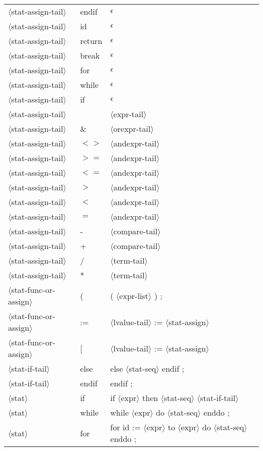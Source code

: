 \documentclass[11pt, fleqn]{article}
\newcommand{\atag}[1]{$\langle$#1$\rangle$}
\begin{document}
\begin{longtable}{l|l|l}
\atag{stat-assign-tail}			&	endif			&	$\epsilon$	\\
\atag{stat-assign-tail}			&	id			&	$\epsilon$	\\
\atag{stat-assign-tail}			&	return			&	$\epsilon$	\\
\atag{stat-assign-tail}			&	break			&	$\epsilon$	\\
\atag{stat-assign-tail}			&	for			&	$\epsilon$	\\
\atag{stat-assign-tail}			&	while			&	$\epsilon$	\\
\atag{stat-assign-tail}			&	if			&	$\epsilon$	\\
\atag{stat-assign-tail}			&	\textbar		&	\atag{expr-tail}	\\
\atag{stat-assign-tail}			&	\&			&	\atag{orexpr-tail}	\\
\atag{stat-assign-tail}			&	$<>$			&	\atag{andexpr-tail}	\\
\atag{stat-assign-tail}			&	$>=$			&	\atag{andexpr-tail}	\\
\atag{stat-assign-tail}			&	$<=$			&	\atag{andexpr-tail}	\\
\atag{stat-assign-tail}			&	$>$			&	\atag{andexpr-tail}	\\
\atag{stat-assign-tail}			&	$<$			&	\atag{andexpr-tail}	\\
\atag{stat-assign-tail}			&	$=$			&	\atag{andexpr-tail}	\\
\atag{stat-assign-tail}			&	-			&	\atag{compare-tail}	\\
\atag{stat-assign-tail}			&	+			&	\atag{compare-tail}	\\
\atag{stat-assign-tail}			&	/			&	\atag{term-tail}	\\
\atag{stat-assign-tail}			&	*			&	\atag{term-tail}	\\
\atag{stat-func-or-assign}		&	(		&	( \atag{expr-list} ) ;	\\
\atag{stat-func-or-assign}		&	:=		&	\atag{lvalue-tail} := \atag{stat-assign}\\
\atag{stat-func-or-assign}		&	[		&	\atag{lvalue-tail} := \atag{stat-assign}	\\
\atag{stat-if-tail}				&	else		&	else \atag{stat-seq} endif ;	\\
\atag{stat-if-tail}				&	endif	&	endif ;	\\
\atag{stat}						&	if		&	if \atag{expr} then \atag{stat-seq} \atag{stat-if-tail}		\\
\atag{stat}						&	while	&	while \atag{expr} do \atag{stat-seq} enddo ;		\\
\atag{stat}						&	for		&	for id := \atag{expr} to \atag{expr} do \atag{stat-seq} enddo ;		\\

\end{longtable}
\end{document}
